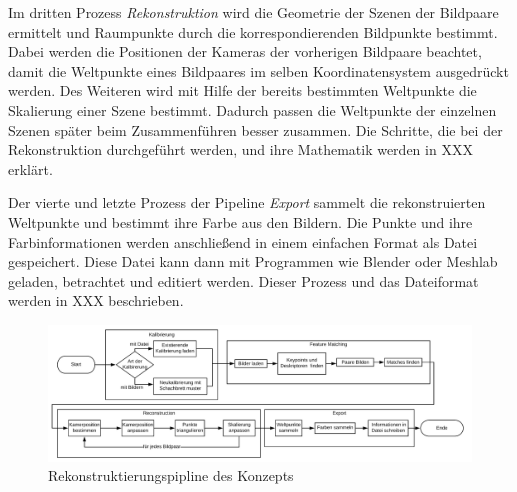 Im dritten Prozess \emph{Rekonstruktion} wird die Geometrie der Szenen der Bildpaare ermittelt und Raumpunkte durch die korrespondierenden Bildpunkte bestimmt.
Dabei werden die Positionen der Kameras der vorherigen Bildpaare beachtet, damit die Weltpunkte eines Bildpaares im selben Koordinatensystem ausgedrückt werden.
Des Weiteren wird mit Hilfe der bereits bestimmten Weltpunkte die Skalierung einer Szene bestimmt.
Dadurch passen die Weltpunkte der einzelnen Szenen später beim Zusammenführen besser zusammen.
Die Schritte, die bei der Rekonstruktion durchgeführt werden, und ihre Mathematik werden in XXX erklärt.

Der vierte und letzte Prozess der Pipeline \emph{Export} sammelt die rekonstruierten Weltpunkte und bestimmt ihre Farbe aus den Bildern.
Die Punkte und ihre Farbinformationen werden anschließend in einem einfachen Format als Datei gespeichert.
Diese Datei kann dann mit Programmen wie Blender oder Meshlab geladen, betrachtet und editiert werden.
Dieser Prozess und das Dateiformat werden in XXX beschrieben.


\begin{figure}
    \centering
    \includegraphics[width=\textwidth]{src/img/konzept-pipeline.png}
    \caption{Rekonstruktierungspipline des Konzepts}
    \label{fig:concept-pipeline}
\end{figure}
